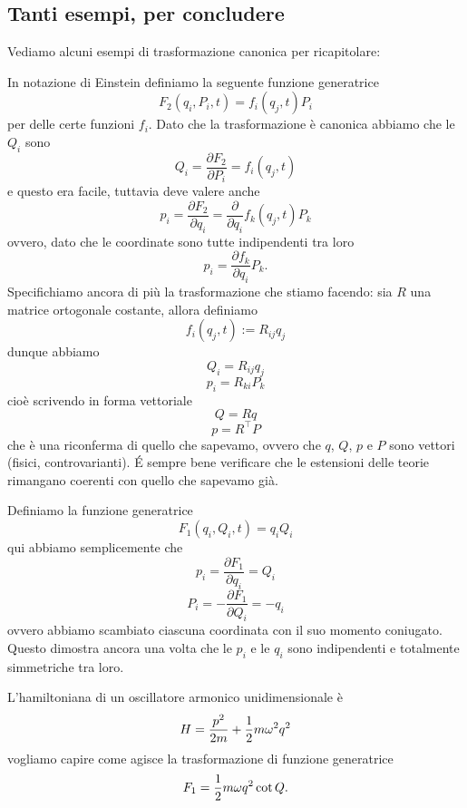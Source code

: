 \documentclass[11pt]{scrartcl}
\begin{document}
	\subsection{Tanti esempi, per concludere}
	Vediamo alcuni esempi di trasformazione canonica per ricapitolare:
	\begin{example}[Vettori]
		In notazione di Einstein definiamo la seguente funzione generatrice
		$$F_2(q_i,P_i,t)=f_i(q_j,t)P_i$$
		per delle certe funzioni $f_i$. Dato che la trasformazione è canonica abbiamo che le $Q_i$ sono
		$$Q_i=\frac{\partial F_2}{\partial P_i}=f_i(q_j,t)$$
		e questo era facile, tuttavia deve valere anche 
		$$p_i=\frac{\partial F_2}{\partial q_i}=\frac{\partial }{\partial q_i}f_k(q_j,t)P_k$$
		ovvero, dato che le coordinate sono tutte indipendenti tra loro
		$$p_i=\frac{\partial f_k}{\partial q_i}P_k.$$
		Specifichiamo ancora di più la trasformazione che stiamo facendo: sia $R$ una matrice ortogonale costante, allora definiamo
		$$f_i(q_j,t):=R_{ij}q_j$$
		dunque abbiamo
		$$Q_i=R_{ij}q_j$$
		$$p_i=R_{ki}P_k$$
		cioè scrivendo in forma vettoriale
		$$Q=Rq$$
		$$p=R^\intercal P$$
		che è una riconferma di quello che sapevamo, ovvero che $q$, $Q$, $p$ e $P$ sono vettori (fisici, controvarianti). \'E sempre bene verificare che le estensioni delle teorie rimangano coerenti con quello che sapevamo già.
	\end{example}
	\begin{example}
		Definiamo la funzione generatrice
		$$F_1(q_i,Q_i,t)=q_iQ_i$$
		qui abbiamo semplicemente che
		$$p_i=\frac{\partial F_1}{\partial q_i}=Q_i$$
		$$P_i=-\frac{\partial F_1}{\partial Q_i}=-q_i$$
		ovvero abbiamo scambiato ciascuna coordinata con il suo momento coniugato. Questo dimostra ancora una volta che le $p_i$ e le $q_i$ sono indipendenti e totalmente simmetriche tra loro.
	\end{example}
	\begin{example}
		L'hamiltoniana di un oscillatore armonico unidimensionale è
		$$H=\frac{p^2}{2m}+\frac{1}{2} m\omega^2q^2$$
		vogliamo capire come agisce la trasformazione di funzione generatrice
		$$F_1=\frac{1}{2} m\omega q^2\cot Q.$$
	\end{example}
\end{document}
